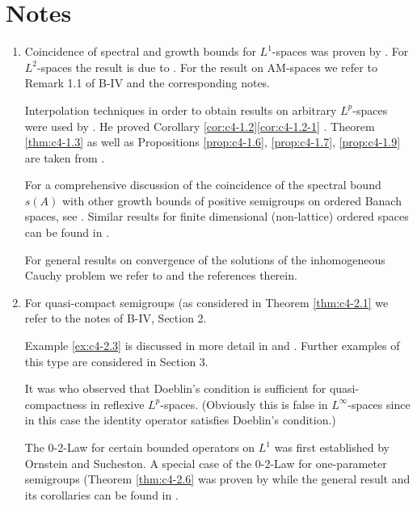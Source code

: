 \section*{Notes}

\begin{enumerate}[label=\emph{Section \arabic*:}, wide]

\item%
Coincidence of spectral and growth bounds for $L^{1}$-spaces was proven by \citet{derndinger:1980}.
For $L^{2}$-spaces the result is due to \citet{greinerNagel:1983}.
For the result on AM-spaces we refer to Remark 1.1 of B-IV and the corresponding notes.

Interpolation techniques in order to obtain results on arbitrary $L^{p}$-spaces were used by \citet{voigt:1985}.
He proved Corollary \ref{cor:c4-1.2}\ref{cor:c4-1.2-1} .
Theorem \ref{thm:c4-1.3} as well as Propositions \ref{prop:c4-1.6}, \ref{prop:c4-1.7}, \ref{prop:c4-1.9}  are taken from \citet{neubrander:1985a}.

For a comprehensive discussion of the coincidence of the spectral bound $s(A)$ with other growth bounds of positive semigroups on ordered Banach spaces, see \citet{klein:1984}.
Similar results for finite dimensional (non-lattice) ordered spaces can be found in \citet{stern:1982}.

For general results on convergence of the solutions of the inhomogeneous Cauchy problem we refer to \citet{pazy:1983} and the references therein.

\item%

For quasi-compact semigroups (as considered in Theorem \ref{thm:c4-2.1} we refer to the notes of B-IV, Section 2.

Example \ref{ex:c4-2.3} is discussed in more detail in \citet{webb:1984} and \citet{greiner:1984}.
Further examples of this type are considered in Section 3.

It was \citet{lotz:1986} who observed that Doeblin's condition is sufficient for quasi-compactness in reflexive $L^{p}$-spaces.
(Obviously this is false in $L^{\infty}$-spaces since in this case the identity operator satisfies Doeblin's condition.)

The 0-2-Law for certain bounded operators on $L^{1}$ was first established by Ornstein and Sucheston.
A special case of the 0-2-Law for one-parameter semigroups (Theorem \ref{thm:c4-2.6} was proven by \citet{winkler:1972} while the general result and its corollaries can be found in \citet{greiner:1982}.


\end{enumerate}
